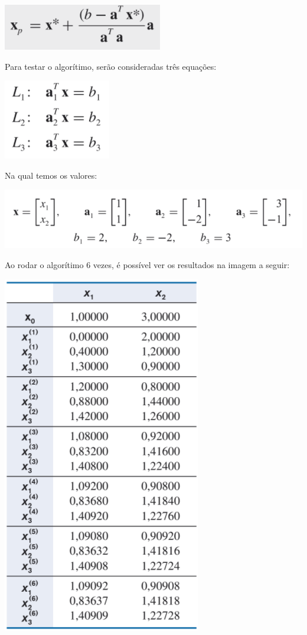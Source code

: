 \documentclass[a4paper, 12pt]{article}
\begin{document}
\includegraphics{projeção ortogonal.png}



Para testar o algorítimo, serão consideradas três equações:


\includegraphics{equacoes.png}

    
Na qual temos os valores:


\includegraphics{coeficientes.png}


Ao rodar o algorítimo 6 vezes, é possível ver os resultados na imagem a seguir:


\includegraphics{resultados.png}
    
\end{document}

